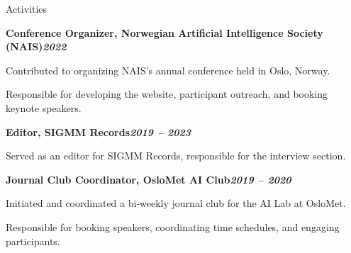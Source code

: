 \begin{rubric}{Activities}
\begin{compactitem}
\end{compactitem}
%
\entry*[]%
\textbf{Conference Organizer, Norwegian Artificial Intelligence Society (NAIS)\hfill\textit{2022}} \par
\begin{compactitem}
    \item Contributed to organizing NAIS's annual conference held in Oslo, Norway.
    \item Responsible for developing the website, participant outreach, and booking keynote speakers.
    \vspace{-12pt}
\end{compactitem}
%
\entry*[]%
\textbf{Editor, SIGMM Records\hfill\textit{2019 -- 2023}} \par
\begin{compactitem}
    \item Served as an editor for SIGMM Records, responsible for the interview section.
    \vspace{-12pt}
\end{compactitem}
%
\entry*[]%
\textbf{Journal Club Coordinator, OsloMet AI Club\hfill\textit{2019 -- 2020}} \par
\begin{compactitem}
    \item Initiated and coordinated a bi-weekly journal club for the AI Lab at OsloMet.
    \item Responsible for booking speakers, coordinating time schedules, and engaging participants.
    \vspace{-12pt}
\end{compactitem}
\end{rubric}